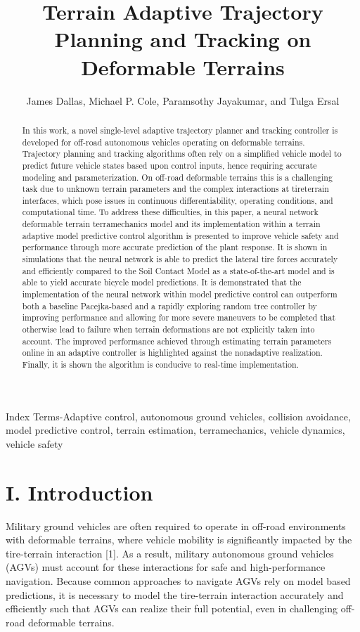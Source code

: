 \documentclass[10pt]{article}
\title{Terrain Adaptive Trajectory Planning and Tracking on Deformable Terrains }
\author{James Dallas, Michael P. Cole, Paramsothy Jayakumar, and Tulga Ersal}
\date{}
\begin{document}
\maketitle
\captionsetup{singlelinecheck=false}


\begin{abstract}
In this work, a novel single-level adaptive trajectory planner and tracking controller is developed for off-road autonomous vehicles operating on deformable terrains. Trajectory planning and tracking algorithms often rely on a simplified vehicle model to predict future vehicle states based upon control inputs, hence requiring accurate modeling and parameterization. On off-road deformable terrains this is a challenging task due to unknown terrain parameters and the complex interactions at tireterrain interfaces, which pose issues in continuous differentiability, operating conditions, and computational time. To address these difficulties, in this paper, a neural network deformable terrain terramechanics model and its implementation within a terrain adaptive model predictive control algorithm is presented to improve vehicle safety and performance through more accurate prediction of the plant response. It is shown in simulations that the neural network is able to predict the lateral tire forces accurately and efficiently compared to the Soil Contact Model as a state-of-the-art model and is able to yield accurate bicycle model predictions. It is demonstrated that the implementation of the neural network within model predictive control can outperform both a baseline Pacejka-based and a rapidly exploring random tree controller by improving performance and allowing for more severe maneuvers to be completed that otherwise lead to failure when terrain deformations are not explicitly taken into account. The improved performance achieved through estimating terrain parameters online in an adaptive controller is highlighted against the nonadaptive realization. Finally, it is shown the algorithm is conducive to real-time implementation.
\end{abstract}

Index Terms-Adaptive control, autonomous ground vehicles, collision avoidance, model predictive control, terrain estimation, terramechanics, vehicle dynamics, vehicle safety

\section*{I. Introduction}
Military ground vehicles are often required to operate in off-road environments with deformable terrains, where vehicle mobility is significantly impacted by the tire-terrain interaction [1]. As a result, military autonomous ground vehicles (AGVs) must account for these interactions for safe and high-performance navigation. Because common approaches to navigate AGVs rely on model based predictions, it is necessary to model the tire-terrain interaction accurately and efficiently such that AGVs can realize their full potential, even in challenging off-road deformable terrains.
\end{document}

